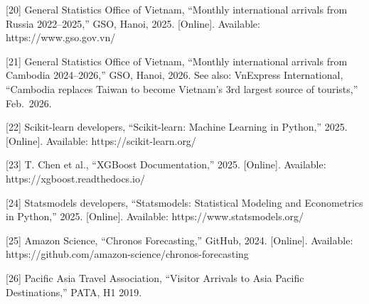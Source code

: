 \documentclass[
]{article}
\begin{document}
{[}20{]} General Statistics Office of Vietnam, ``Monthly international
arrivals from Russia 2022--2025,'' GSO, Hanoi, 2025. {[}Online{]}.
Available: https://www.gso.gov.vn/

{[}21{]} General Statistics Office of Vietnam, ``Monthly international
arrivals from Cambodia 2024--2026,'' GSO, Hanoi, 2026. See also:
VnExpress International, ``Cambodia replaces Taiwan to become Vietnam's
3rd largest source of tourists,'' Feb.~2026.

{[}22{]} Scikit-learn developers, ``Scikit-learn: Machine Learning in
Python,'' 2025. {[}Online{]}. Available: https://scikit-learn.org/

{[}23{]} T. Chen et al., ``XGBoost Documentation,'' 2025. {[}Online{]}.
Available: https://xgboost.readthedocs.io/

{[}24{]} Statsmodels developers, ``Statsmodels: Statistical Modeling and
Econometrics in Python,'' 2025. {[}Online{]}. Available:
https://www.statsmodels.org/

{[}25{]} Amazon Science, ``Chronos Forecasting,'' GitHub, 2024.
{[}Online{]}. Available:
https://github.com/amazon-science/chronos-forecasting

{[}26{]} Pacific Asia Travel Association, ``Visitor Arrivals to Asia
Pacific Destinations,'' PATA, H1 2019.
\end{document}
